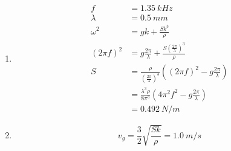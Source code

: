 \documentclass{article}
\begin{document}
\subsection{}

\begin{enumerate}
  \item

        \begin{align*}
          f           & = \qty{1.35}{kHz}                                                                                          \\
          \lambda     & = \qty{0.5}{mm}                                                                                            \\
          \omega^2    & = g k + \frac{S k^3}{\rho}                                                                                 \\
          (2 \pi f)^2 & = g \frac{2 \pi}{\lambda} + \frac{S \left( \frac{2 \pi}{\lambda} \right)^3}{\rho}                          \\
          S           & = \frac{\rho}{\left( \frac{2 \pi}{\lambda} \right)^3} \left( (2 \pi f)^2 - g \frac{2 \pi}{\lambda} \right) \\
                      & = \frac{\lambda^3 \rho}{8 \pi^3} \left( 4 \pi^2 f^2 - g \frac{2 \pi}{\lambda} \right)                      \\
                      & = \qty{0.492}{N/m}
        \end{align*}

  \item \[v_g = \frac{3}{2} \sqrt{\frac{S k}{\rho}} = \qty{1.0}{m/s}\]
\end{enumerate}

\subsection{}
\end{document}

